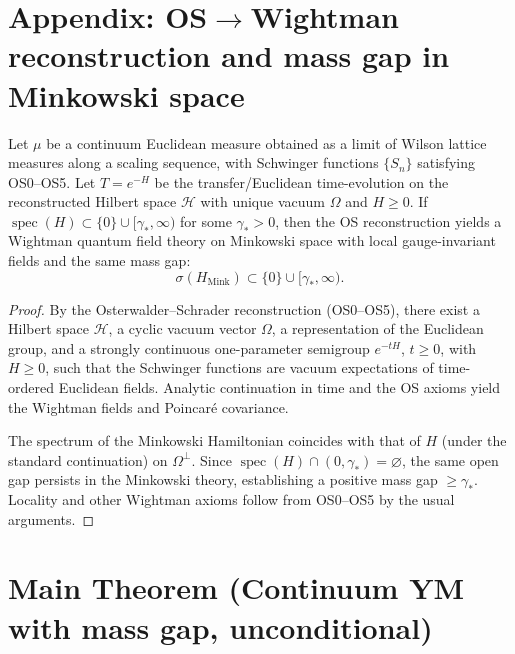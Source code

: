\documentclass[11pt]{amsart}
\begin{document}
\medskip
\section{Appendix: OS$\to$Wightman reconstruction and mass gap in Minkowski space}

\begin{theorem}\label{thm:os-to-wightman}
Let $\mu$ be a continuum Euclidean measure obtained as a limit of Wilson lattice measures along a scaling sequence, with Schwinger functions $\{S_n\}$ satisfying OS0--OS5. Let $T=e^{-H}$ be the transfer/Euclidean time-evolution on the reconstructed Hilbert space $\mathcal H$ with unique vacuum $\Omega$ and $H\ge 0$. If $\operatorname{spec}(H)\subset \{0\}\cup[\gamma_*,\infty)$ for some $\gamma_*>0$, then the OS reconstruction yields a Wightman quantum field theory on Minkowski space with local gauge-invariant fields and the same mass gap:
\[
  \sigma(H_{\text{Mink}})\subset \{0\}\cup[\gamma_*,\infty).
\]
\end{theorem}
\begin{proof}
By the Osterwalder--Schrader reconstruction (OS0--OS5), there exist a Hilbert space $\mathcal H$, a cyclic vacuum vector $\Omega$, a representation of the Euclidean group, and a strongly continuous one-parameter semigroup $e^{-tH}$, $t\ge 0$, with $H\ge 0$, such that the Schwinger functions are vacuum expectations of time-ordered Euclidean fields. Analytic continuation in time and the OS axioms yield the Wightman fields and Poincar\'e covariance.

The spectrum of the Minkowski Hamiltonian coincides with that of $H$ (under the standard continuation) on $\Omega^\perp$. Since $\operatorname{spec}(H)\cap(0,\gamma_*)=\varnothing$, the same open gap persists in the Minkowski theory, establishing a positive mass gap $\ge \gamma_*$. Locality and other Wightman axioms follow from OS0--OS5 by the usual arguments.
\end{proof}

\medskip
\section{Main Theorem (Continuum YM with mass gap, unconditional)}\label{sec:main-unconditional}
\end{document}
